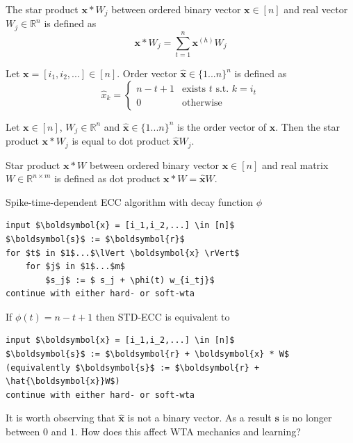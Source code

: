 \documentclass[oneside,english,logo]{amuthesis}
\begin{document}
\begin{definition}
The star product $\boldsymbol{x} * W_j$ between ordered binary vector $\boldsymbol{x}\in [n]$ and real vector $W_j \in \mathbb{R}^n$ is defined as \[\boldsymbol{x} * W_j=\sum_{t=1}^{n} \boldsymbol{x}^{(h)} W_j\]
\end{definition}
\begin{definition}
Let $\boldsymbol{x}=[i_1,i_2,...] \in [n]$. Order vector $\hat{\boldsymbol{x}} \in \{1...n\}^n$ is defined as
\begin{equation*}
\hat{x}_{k} = \begin{cases}
		n-t+1 & \text{exists } t  \text{ s.t. } k=i_t\\
		0 &\text{otherwise}
	\end{cases}
\end{equation*}
\end{definition}
\begin{lemma}
Let $\boldsymbol{x}\in [n]$, $W_j \in\mathbb{R}^n$ and $\hat{\boldsymbol{x}} \in \{1...n\}^n$ is the order vector of $\boldsymbol{x}$.
Then the star product $\boldsymbol{x} * W_j$ is equal to dot product $\hat{\boldsymbol{x}} W_j$.
\end{lemma}
\begin{definition}
Star product $\boldsymbol{x} * W$ between ordered binary vector $\boldsymbol{x}\in [n]$ and real matrix $W \in\mathbb{R}^{n\times m}$ is defined as dot product $\boldsymbol{x} * W = \hat{\boldsymbol{x}} W$.
\end{definition}
\begin{definition} Spike-time-dependent ECC algorithm with decay function  $\phi$ 
\begin{lstlisting}
input $\boldsymbol{x} = [i_1,i_2,...] \in [n]$
$\boldsymbol{s}$ := $\boldsymbol{r}$ 
for $t$ in $1$...$\lVert \boldsymbol{x} \rVert$   
    for $j$ in $1$...$m$
        $s_j$ := $ s_j + \phi(t) w_{i_tj}$ 
continue with either hard- or soft-wta
\end{lstlisting}

\end{definition}
\begin{lemma}
If $\phi(t) = n - t + 1$ then STD-ECC is equivalent to
\begin{lstlisting}
input $\boldsymbol{x} = [i_1,i_2,...] \in [n]$
$\boldsymbol{s}$ := $\boldsymbol{r} + \boldsymbol{x} * W$ (equivalently $\boldsymbol{s}$ := $\boldsymbol{r} + \hat{\boldsymbol{x}}W$)
continue with either hard- or soft-wta
\end{lstlisting}
\end{lemma}
It is worth observing that $\hat{\boldsymbol{x}}$ is not a binary vector. As a result $\boldsymbol{s}$ is no longer between $0$ and $1$. How does this affect WTA mechanics and learning?
\end{document}
